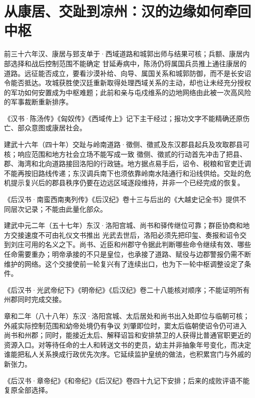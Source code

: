 \section{从康居、交趾到凉州：汉的边缘如何牵回中枢}
\begin{event}{}{前三十六年}{汉、康居与郅支单于·西域道路和城郭}{出师与结果可核；兵额、康居内部选择和战后控制范围不能确定}
甘延寿病中，陈汤仍将属国兵员推上通往康居的道路。远征能否成立，要看沙漠补给、向导、属国关系和城郭防御，而不是长安诏令能否抵达。攻城获胜使汉廷重新取得处理西域关系的主动，却也让未经充分授权的军功如何安置成为中枢难题；此前和亲与屯戍维系的边地网络由此被一次高风险的军事裁断重新排序。

《汉书·陈汤传》《匈奴传》《西域传上》记下主干经过；报功文字不能精确还原伤亡、部众意图或康居社会。
\end{event}

\begin{event}{}{建武十六年（四十年）}{交趾与岭南道路·徵侧、徵贰及东汉郡县}{起兵及攻取郡县可核；响应范围和地方社会立场不能写成一致}
徵侧、徵贰的行动首先冲击了把县、郡、海湾和北向道路接回洛阳的行政链。地方据点易手后，诏令、税粮和官吏迁调不能再按旧路线传递；东汉调兵南下也须依靠岭南水陆通行和沿线供给。交趾的危机提示复兴后的郡县秩序仍要在边远区域逐段维持，并非一个已经完成的恢复。

《后汉书·南蛮西南夷列传》《后汉纪》卷十三与后出的《大越史记全书》提供不同层次记录；不能由此量化部众。
\end{event}

\begin{event}{}{建武中元二年（五十七年）}{东汉·洛阳宫城、尚书和驿传}{继位可靠；群臣协商和地方交接速度不可由礼仪文书推出}
光武去世后，洛阳必须先把印玺、奏报和诏令交到刘庄可用的名义之下。尚书、近臣和州郡守令据此判断哪些命令继续有效、哪些任命需要重办；明帝承接的不只是皇位，也承接了道路、赋役与边郡警报仍需不断维护的网络。这个交接使前一轮复兴有了连续出口，也为下一轮中枢调整设定了条件。

《后汉书·光武帝纪下》《明帝纪》《后汉纪》卷二十八能核对顺序；不能证明所有州郡同时完成交接。
\end{event}

\begin{event}{}{章和二年（八十八年）}{东汉·洛阳宫城、太后居处和尚书出入处}{即位与临朝可核；外戚实际控制范围和幼帝处境仍有争议}
刘肇即位时，窦太后临朝使诏令仍可进入尚书和州郡；同时，能接近太后、解释诏旨和安排禁卫的人获得比普通官职更近的资源入口。对等待任命的士人和转送文书的吏员，幼主并非抽象年号变化，而决定谁能把私人关系换成行政优先次序。它延续监护皇统的做法，也积累宫门与外戚的新张力。

《后汉书·章帝纪》《和帝纪》《后汉纪》卷四十九记下安排；后来的成败评语不能复原全部选择。
\end{event}

